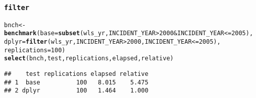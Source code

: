 \documentclass{beamer}\usepackage[]{graphicx}\usepackage[]{color}
\makeatletter
\newcommand{\hlnum}[1]{\textcolor[rgb]{0.686,0.059,0.569}{#1}}%
\newcommand{\hlopt}[1]{\textcolor[rgb]{0,0,0}{#1}}%
\newcommand{\hlstd}[1]{\textcolor[rgb]{0.345,0.345,0.345}{#1}}%
\newcommand{\hlkwb}[1]{\textcolor[rgb]{0.69,0.353,0.396}{#1}}%
\newcommand{\hlkwc}[1]{\textcolor[rgb]{0.333,0.667,0.333}{#1}}%
\newcommand{\hlkwd}[1]{\textcolor[rgb]{0.737,0.353,0.396}{\textbf{#1}}}%
\newenvironment{kframe}{%
 \def\at@end@of@kframe{}%
 \ifinner\ifhmode%
  \def\at@end@of@kframe{\end{minipage}}%
  \begin{minipage}{\columnwidth}%
 \fi\fi%
 \def\FrameCommand##1{\hskip\@totalleftmargin \hskip-\fboxsep
 \colorbox{shadecolor}{##1}\hskip-\fboxsep
     \hskip-\linewidth \hskip-\@totalleftmargin \hskip\columnwidth}%
 \MakeFramed {\advance\hsize-\width
   \@totalleftmargin\z@ \linewidth\hsize
   \@setminipage}}%
 {\par\unskip\endMakeFramed%
 \at@end@of@kframe}
\newenvironment{knitrout}{}{} %
\makeatother
\begin{document}
\begin{frame}[fragile]
  \frametitle{{\tt filter}}
\begin{knitrout}\footnotesize
{}\color{fgcolor}\begin{kframe}
\begin{alltt}
\hlstd{bnch} \hlkwb{<-}
  \hlkwd{benchmark}\hlstd{(}\hlkwc{base} \hlstd{=} \hlkwd{subset}\hlstd{(wls_yr, INCIDENT_YEAR} \hlopt{>} \hlnum{2000} \hlopt{&} \hlstd{INCIDENT_YEAR} \hlopt{<=} \hlnum{2005}\hlstd{),}
            \hlkwc{dplyr} \hlstd{=} \hlkwd{filter}\hlstd{(wls_yr, INCIDENT_YEAR} \hlopt{>} \hlnum{2000}\hlstd{, INCIDENT_YEAR} \hlopt{<=} \hlnum{2005}\hlstd{),}
            \hlkwc{replications} \hlstd{=} \hlnum{100}\hlstd{)}
\hlkwd{select}\hlstd{(bnch, test, replications, elapsed, relative)}
\end{alltt}
\begin{verbatim}
##    test replications elapsed relative
## 1  base          100   8.015    5.475
## 2 dplyr          100   1.464    1.000
\end{verbatim}
\end{kframe}
\end{knitrout}
\end{frame} 
\end{document}
